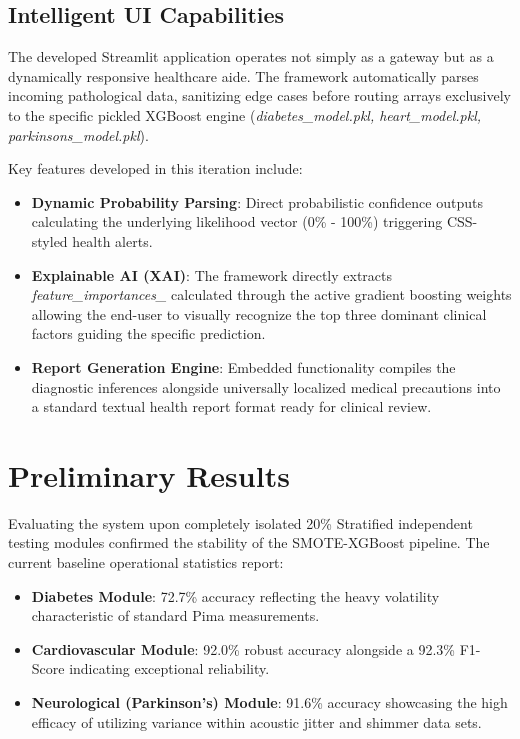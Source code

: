 \documentclass[conference]{IEEEtran}
\begin{document}
\subsection{Intelligent UI Capabilities}
The developed Streamlit application operates not simply as a gateway but as a dynamically responsive healthcare aide. The framework automatically parses incoming pathological data, sanitizing edge cases before routing arrays exclusively to the specific pickled XGBoost engine (\textit{diabetes\_model.pkl, heart\_model.pkl, parkinsons\_model.pkl}).

Key features developed in this iteration include:
\begin{itemize}
    \item \textbf{Dynamic Probability Parsing}: Direct probabilistic confidence outputs calculating the underlying likelihood vector (0\% - 100\%) triggering CSS-styled health alerts.
    \item \textbf{Explainable AI (XAI)}: The framework directly extracts \textit{feature\_importances\_} calculated through the active gradient boosting weights allowing the end-user to visually recognize the top three dominant clinical factors guiding the specific prediction.
    \item \textbf{Report Generation Engine}: Embedded functionality compiles the diagnostic inferences alongside universally localized medical precautions into a standard textual health report format ready for clinical review.
\end{itemize}

\section{Preliminary Results}
Evaluating the system upon completely isolated 20\% Stratified independent testing modules confirmed the stability of the SMOTE-XGBoost pipeline. The current baseline operational statistics report:
\begin{itemize}
    \item \textbf{Diabetes Module}: 72.7\% accuracy reflecting the heavy volatility characteristic of standard Pima measurements.
    \item \textbf{Cardiovascular Module}: 92.0\% robust accuracy alongside a 92.3\% F1-Score indicating exceptional reliability.
    \item \textbf{Neurological (Parkinson's) Module}: 91.6\% accuracy showcasing the high efficacy of utilizing variance within acoustic jitter and shimmer data sets.
\end{itemize}
\end{document}
